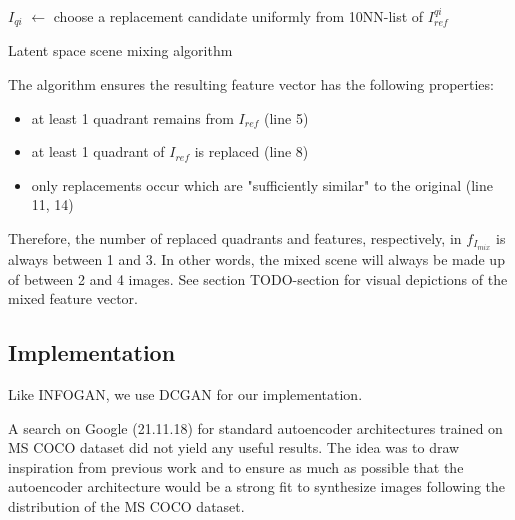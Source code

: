 \documentclass[12pt,a4paper]{article}
\begin{document}
\begin{algorithm}[H]
\DontPrintSemicolon
\LinesNumbered
{}
 {
    $I_{qi}$ $\leftarrow$ choose a replacement candidate uniformly from 10NN-list of $I^{qi}_{ref}$\;
}
 {
} 
\caption{Latent space scene mixing algorithm}\label{alg:img_mixing_algo}
\end{algorithm}

The algorithm ensures the resulting feature vector has the following properties:
\begin{itemize}
   \item at least 1 quadrant remains from $I_{ref}$ (line 5)
   \item at least 1 quadrant of $I_{ref}$ is replaced (line 8)
   \item only replacements occur which are "sufficiently similar" to the original (line 11, 14)
\end{itemize}
Therefore, the number of replaced quadrants and features, respectively, in $f_{I_{mix}}$ is always between 1 and 3. In other words, the mixed scene will always be made up of between 2 and 4 images. See section TODO-section for visual depictions of the mixed feature vector.


\subsection{Implementation}
Like INFOGAN, we use DCGAN for our implementation.

\par A search on Google (21.11.18) for standard autoencoder architectures trained on MS COCO dataset did not yield any useful results. The idea was to draw inspiration from previous work and to ensure as much as possible that the autoencoder architecture would be a strong fit to synthesize images following the distribution of the MS COCO dataset.
\end{document}
